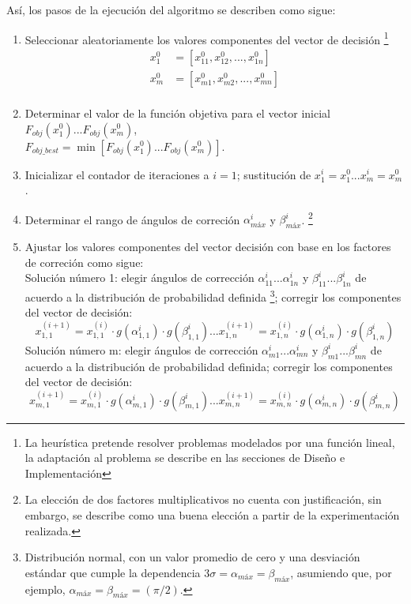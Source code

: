 \documentclass[a4paper]{report}
\begin{document}
  \clearpage
  As\'i, los pasos de la ejecuci\'on del algoritmo se describen como sigue:
  \begin{enumerate}
  \item Seleccionar aleatoriamente los valores componentes del vector de decisi\'on
    \footnote{La heur\'istica pretende resolver problemas modelados por una funci\'on
      lineal, la adaptaci\'on al problema se describe en las secciones de Dise\~no e
      Implementaci\'on}
    \begin{align*}
      x_1^0 &= [x_{11}^0, x_{12}^0, ..., x_{1n}^0] \tag{Vector inicial 1}\\
      x_m^0 &= [x_{m1}^0, x_{m2}^0, ..., x_{mn}^0] \tag{Vector inicial m}\\
    \end{align*}

  \item Determinar el valor de la funci\'on objetiva para el vector inicial $F_{obj}(x_1^0)
    ...F_{obj}(x_m^0)$,\\ $ F_{obj\_best} = \min[F_{obj}(x_1^0) ... F_{obj}(x_m^0)]$.
  \item Inicializar el contador de iteraciones a $i = 1$; sustituci\'on de
    $x_1^i = x_1^0 ... x_m^i = x_m^0$.
  \item Determinar el rango de \'angulos de correci\'on $\alpha^i_{\textit{m\'ax}}$
    y $\beta^i_{\textit{m\'ax}}$.
    \footnote{La elecci\'on de dos factores multiplicativos no cuenta con justificaci\'on, sin
      embargo, se describe como una buena elecci\'on a partir de la experimentaci\'on realizada.}
  \item Ajustar los valores componentes del vector decisi\'on con base en los factores de
    correci\'on como sigue:\\

      Soluci\'on n\'umero 1: elegir \'angulos de correcci\'on $\alpha^i_{11} ... \alpha^i_{1n}$ y
      $\beta^i_{11} ... \beta^i_{1n}$ de acuerdo a la distribuci\'on de probabilidad definida
      \footnote{Distribuci\'on normal, con un valor promedio de cero y una desviaci\'on
        est\'andar que cumple la dependencia $3 \sigma = \alpha_{\textit{m\'ax}} =
        \beta_{\textit{m\'ax}}$, asumiendo que, por ejemplo, $\alpha_{\textit{m\'ax}} =
        \beta_{\textit{m\'ax}} = (\pi/2)$.};
      corregir los componentes del vector de decisi\'on:
      \[x_{1,1}^{(i+1)} = x_{1,1}^{(i)} \cdot g(\alpha_{1,1}^i) \cdot g(\beta_{1,1}^i)
        ...x_{1,n}^{(i+1)} = x_{1,n}^{(i)} \cdot g(\alpha_{1,n}^i) \cdot g(\beta_{1,n}^i)\]
      Soluci\'on n\'umero m: elegir \'angulos de correcci\'on $\alpha^i_{m1} ... \alpha^i_{mn}$ y
      $\beta^i_{m1} ... \beta^i_{mn}$ de acuerdo a la distribuci\'on de probabilidad definida;
      corregir los componentes del vector de decisi\'on:
      \[x_{m,1}^{(i+1)} = x_{m,1}^{(i)} \cdot g(\alpha_{m,1}^i) \cdot g(\beta_{m,1}^i)
      ...x_{m,n}^{(i+1)} = x_{m,n}^{(i)} \cdot g(\alpha_{m,n}^i) \cdot g(\beta_{m,n}^i)\]


\end{enumerate}
\end{document}
